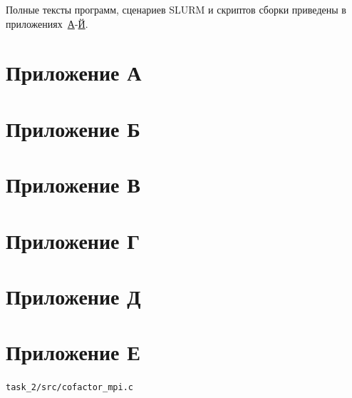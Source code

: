 \documentclass[areasetadvanced]{scrartcl}
\newcommand{\appref}[2]{\hyperref[#1]{#2}}
\begin{document}
Полные тексты программ, сценариев SLURM и скриптов сборки приведены в приложениях~\appref{app:t1-main}{А}-\appref{app:t2-build}{Й}.

\newpage
\section*{Приложение А}
\label{app:t1-main}


\newpage
\section*{Приложение Б}
\label{app:t1-slurm-cuda}


\newpage
\section*{Приложение В}
\label{app:t1-slurm-intel}


\newpage
\section*{Приложение Г}
\label{app:t1-lininput}


\newpage
\section*{Приложение Д}
\label{app:t1-build}


\newpage
\section*{Приложение Е}
\label{app:t2-mpi}
\begin{center}\footnotesize\texttt{task\_2/src/cofactor\_mpi.c}\end{center}
\end{document}

